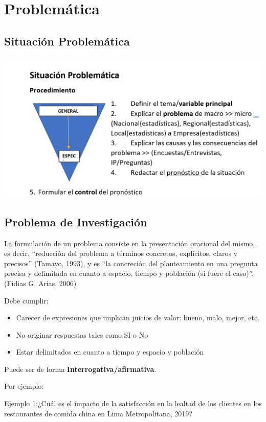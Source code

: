 \chapter{Problemática}
\label{Problemática}

\section{Situación Problemática}

\includegraphics[scale=0.5]{img/problem_sec.png}

\section{Problema de Investigación}

La formulación de un problema consiste en la presentación oracional del mismo, es decir, “reducción del problema a términos concretos, explícitos, claros y precisos” (Tamayo, 1993), y es “la concreción del planteamiento en una pregunta precisa y delimitada en cuanto a espacio, tiempo y población (si fuere el caso)”. (Fidias G. Arias, 2006)

Debe cumplir:
\begin{itemize}
    \item Carecer de expresiones que implican juicios de valor: bueno, malo, mejor, etc.
    \item No originar respuestas tales como SI o No
    \item Estar delimitados en cuanto a tiempo y espacio y población
\end{itemize}

Puede ser de forma \textbf{Interrogativa/afirmativa}.


Por ejemplo:

Ejemplo 1:¿Cuál es el impacto de la satisfacción en la lealtad de los clientes en los restaurantes de comida china en Lima Metropolitana, 2019?

